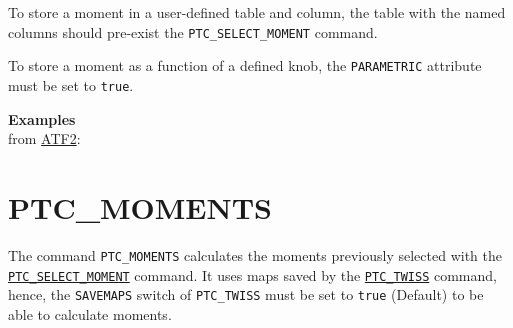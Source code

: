 To store a moment in a user-defined table and column, the table with the
named columns should pre-exist the \texttt{PTC\_SELECT\_MOMENT} command.

To store a moment as a function of a defined knob, the
\texttt{PARAMETRIC} attribute must be set to \texttt{true}.

\textbf{Examples}\\
from
\href{http://cern.ch/frs/mad-X_examples/ptc_madx_interface/moments/moments.madx}{ATF2}:





%


\section{PTC\_MOMENTS}
\label{sec:ptc-moments}

The command \texttt{PTC\_MOMENTS} calculates the moments previously
selected with the
\hyperref[sec:ptc-select-moment]{\texttt{PTC\_SELECT\_MOMENT}}
command.  It uses maps saved by the
\hyperref[sec:ptc-twiss]{\texttt{PTC\_TWISS}} command, hence,
the \texttt{SAVEMAPS} switch of \texttt{PTC\_TWISS} must be set to
\texttt{true} (Default) to be able to calculate moments.


